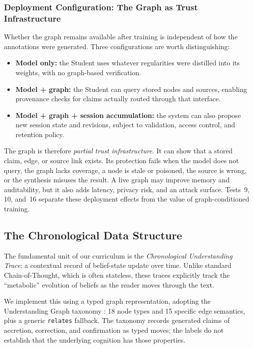 \subsubsection{Deployment Configuration: The Graph as Trust Infrastructure}
\label{sec:deployment-config}

Whether the graph remains available after training is independent of how the
annotations were generated. Three configurations are worth distinguishing:

\begin{itemize}[leftmargin=*]
    \item \textbf{Model only:} the Student uses whatever regularities were
    distilled into its weights, with no graph-based verification.
    \item \textbf{Model + graph:} the Student can query stored nodes and
    sources, enabling provenance checks for claims actually routed through that
    interface.
    \item \textbf{Model + graph + session accumulation:} the system can also
    propose new session state and revisions, subject to validation, access
    control, and retention policy.
\end{itemize}

The graph is therefore \emph{partial trust infrastructure}. It can show that a
stored claim, edge, or source link exists. Its protection fails when the model
does not query, the graph lacks coverage, a node is stale or poisoned, the
source is wrong, or the synthesis misuses the result. A live graph may improve
memory and auditability, but it also adds latency, privacy risk, and an attack
surface. Tests~9, 10, and~16 separate these deployment effects from the value of
graph-conditioned training.


\subsection{The Chronological Data Structure}
\label{sec:data-structure}

The fundamental unit of our curriculum is the \emph{Chronological Understanding Trace}: a contextual record of belief-state update over time. Unlike standard Chain-of-Thought, which is often stateless, these traces explicitly track the ``metabolic'' evolution of beliefs as the reader moves through the text.

We implement this using a typed graph representation, adopting the Understanding
Graph taxonomy \cite{westerberg2026understanding}: 18 node types and 15 specific
edge semantics, plus a generic \texttt{relates} fallback. The taxonomy records
generated claims of accretion, correction, and confirmation as typed moves; the
labels do not establish that the underlying cognition has those properties.

